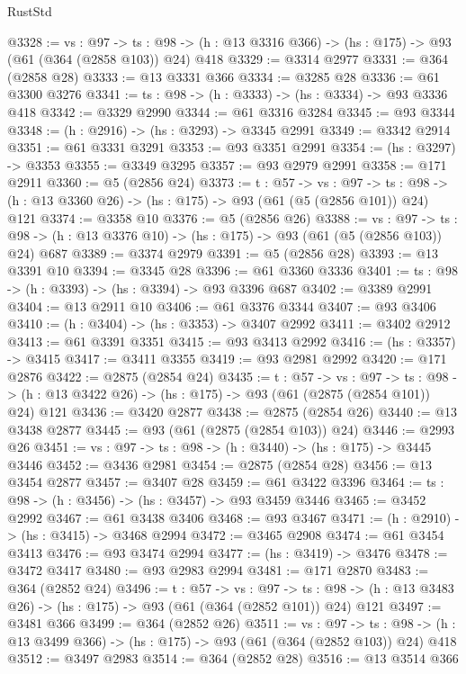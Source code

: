 \begin{lexlean}{RustStd}
\begin{coremodule}
@3328 := {vs : @97} ->
  {ts : @98} -> (h : @13 @3316 @366) -> (hs : @175) -> @93 (@61 (@364 (@2858 @103)) @24) @418
@3329 := @3314 @2977
@3331 := @364 (@2858 @28)
@3333 := @13 @3331 @366
@3334 := @3285 @28
@3336 := @61 @3300 @3276
@3341 := {ts : @98} -> (h : @3333) -> (hs : @3334) -> @93 @3336 @418
@3342 := @3329 @2990
@3344 := @61 @3316 @3284
@3345 := @93 @3344
@3348 := (h : @2916) -> (hs : @3293) -> @3345 @2991
@3349 := @3342 @2914
@3351 := @61 @3331 @3291
@3353 := @93 @3351 @2991
@3354 := (hs : @3297) -> @3353
@3355 := @3349 @3295
@3357 := @93 @2979 @2991
@3358 := @171 @2911
@3360 := @5 (@2856 @24)
@3373 := {t : @57} ->
  {vs : @97} ->
  {ts : @98} -> (h : @13 @3360 @26) -> (hs : @175) -> @93 (@61 (@5 (@2856 @101)) @24) @121
@3374 := @3358 @10
@3376 := @5 (@2856 @26)
@3388 := {vs : @97} ->
  {ts : @98} -> (h : @13 @3376 @10) -> (hs : @175) -> @93 (@61 (@5 (@2856 @103)) @24) @687
@3389 := @3374 @2979
@3391 := @5 (@2856 @28)
@3393 := @13 @3391 @10
@3394 := @3345 @28
@3396 := @61 @3360 @3336
@3401 := {ts : @98} -> (h : @3393) -> (hs : @3394) -> @93 @3396 @687
@3402 := @3389 @2991
@3404 := @13 @2911 @10
@3406 := @61 @3376 @3344
@3407 := @93 @3406
@3410 := (h : @3404) -> (hs : @3353) -> @3407 @2992
@3411 := @3402 @2912
@3413 := @61 @3391 @3351
@3415 := @93 @3413 @2992
@3416 := (hs : @3357) -> @3415
@3417 := @3411 @3355
@3419 := @93 @2981 @2992
@3420 := @171 @2876
@3422 := @2875 (@2854 @24)
@3435 := {t : @57} ->
  {vs : @97} ->
  {ts : @98} -> (h : @13 @3422 @26) -> (hs : @175) -> @93 (@61 (@2875 (@2854 @101)) @24) @121
@3436 := @3420 @2877
@3438 := @2875 (@2854 @26)
@3440 := @13 @3438 @2877
@3445 := @93 (@61 (@2875 (@2854 @103)) @24)
@3446 := @2993 @26
@3451 := {vs : @97} -> {ts : @98} -> (h : @3440) -> (hs : @175) -> @3445 @3446
@3452 := @3436 @2981
@3454 := @2875 (@2854 @28)
@3456 := @13 @3454 @2877
@3457 := @3407 @28
@3459 := @61 @3422 @3396
@3464 := {ts : @98} -> (h : @3456) -> (hs : @3457) -> @93 @3459 @3446
@3465 := @3452 @2992
@3467 := @61 @3438 @3406
@3468 := @93 @3467
@3471 := (h : @2910) -> (hs : @3415) -> @3468 @2994
@3472 := @3465 @2908
@3474 := @61 @3454 @3413
@3476 := @93 @3474 @2994
@3477 := (hs : @3419) -> @3476
@3478 := @3472 @3417
@3480 := @93 @2983 @2994
@3481 := @171 @2870
@3483 := @364 (@2852 @24)
@3496 := {t : @57} ->
  {vs : @97} ->
  {ts : @98} -> (h : @13 @3483 @26) -> (hs : @175) -> @93 (@61 (@364 (@2852 @101)) @24) @121
@3497 := @3481 @366
@3499 := @364 (@2852 @26)
@3511 := {vs : @97} ->
  {ts : @98} -> (h : @13 @3499 @366) -> (hs : @175) -> @93 (@61 (@364 (@2852 @103)) @24) @418
@3512 := @3497 @2983
@3514 := @364 (@2852 @28)
@3516 := @13 @3514 @366

\end{coremodule}
\end{lexlean}

